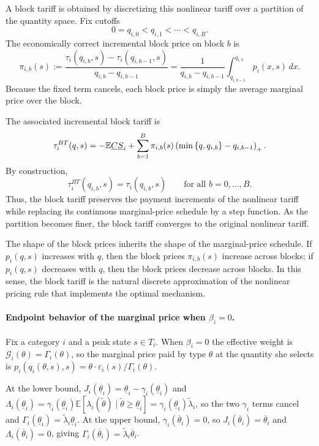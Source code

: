\documentclass{class}
\begin{document}
A block tariff is obtained by discretizing this nonlinear tariff over a partition of the quantity space. Fix cutoffs
\[
0=q_{i,0}<q_{i,1}<\cdots<q_{i,B}.
\]
The economically correct incremental block price on block \(b\) is
\[
\pi_{i,b}(s)
:=
\frac{\tau_i\left(q_{i,b},s\right)-\tau_i\left(q_{i,b-1},s\right)}
{q_{i,b}-q_{i,b-1}}
=
\frac{1}{q_{i,b}-q_{i,b-1}}
\int_{q_{i,b-1}}^{q_{i,b}} p_i(x,s)\,dx.
\]
Because the fixed term cancels, each block price is simply the average marginal price over the block.

The associated incremental block tariff is
\[
\tau_i^{BT}(q,s)
=
-\mathbb{E}\underline{CS}_i
+
\sum_{b=1}^B
\pi_{i,b}(s)
\left(\min\left\{q,q_{i,b}\right\}-q_{i,b-1}\right)_+.
\]
By construction,
\[
\tau_i^{BT}\left(q_{i,b},s\right)=\tau_i\left(q_{i,b},s\right)
\qquad \text{for all } b=0,\dots,B.
\]
Thus, the block tariff preserves the payment increments of the nonlinear tariff while replacing its continuous marginal-price schedule by a step function. As the partition becomes finer, the block tariff converges to the original nonlinear tariff.

The shape of the block prices inherits the shape of the marginal-price schedule. If \(p_i(q,s)\) increases with \(q\), then the block prices \(\pi_{i,b}(s)\) increase across blocks; if \(p_i(q,s)\) decreases with \(q\), then the block prices decrease across blocks. In this sense, the block tariff is the natural discrete approximation of the nonlinear pricing rule that implements the optimal mechanism.


\paragraph{Endpoint behavior of the marginal price when $\beta_i = 0$.}
Fix a category $i$ and a peak state $s \in T_i$. When $\beta_i = 0$ the effective weight is $\mathcal{G}_i(\theta) = \Gamma_i(\theta)$, so the marginal price paid by type $\theta$ at the quantity she selects is $p_i(q_i(\theta,s),s) = \theta \cdot \varepsilon_i(s)/\Gamma_i(\theta)$.

At the lower bound, $J_i(\underline{\theta}_i) = \underline{\theta}_i - \gamma_i(\underline{\theta}_i)$ and $\Lambda_i(\underline{\theta}_i) = \gamma_i(\underline{\theta}_i)\mathbb{E}[\lambda_i(\tilde{\theta}) \mid \tilde{\theta} \geq \underline{\theta}_i] = \gamma_i(\underline{\theta}_i)\tilde{\lambda}_i$, so the two $\gamma_i$ terms cancel and $\Gamma_i(\underline{\theta}_i) = \tilde{\lambda}_i\underline{\theta}_i$. At the upper bound, $\gamma_i(\overline{\theta}_i) = 0$, so $J_i(\overline{\theta}_i) = \overline{\theta}_i$ and $\Lambda_i(\overline{\theta}_i) = 0$, giving $\Gamma_i(\overline{\theta}_i) = \tilde{\lambda}_i\overline{\theta}_i$.
\end{document}
